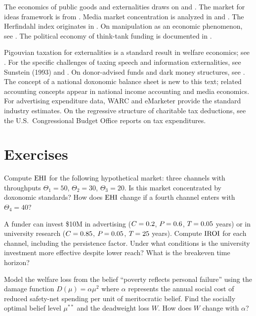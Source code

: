 The economics of public goods and externalities draws on \textcite{stiglitz2012} and \textcite{arrow1963}.
The market for ideas framework is from \textcite{coase1974}.
Media market concentration is analyzed in \textcite{bagdikian2004} and \textcite{mcchesney1999}.
The Herfindahl index originates in \textcite{herfindahl1950}.
On manipulation as an economic phenomenon, see \textcite{akerlof2015}.
The political economy of think-tank funding is documented in \textcite{mayer2016}.

Pigouvian taxation for externalities is a standard result in welfare economics; see \textcite{stiglitz2012}.
For the specific challenges of taxing speech and information externalities, see Sunstein (1993) and \textcite{sunstein2017}.
On donor-advised funds and dark money structures, see \textcite{mayer2016}.
The concept of a national doxonomic balance sheet is new to this text; related accounting concepts appear in national income accounting and media economics.
For advertising expenditure data, WARC and eMarketer provide the standard industry estimates.
On the regressive structure of charitable tax deductions, see the U.S.\ Congressional Budget Office reports on tax expenditures.


\section{Exercises}

\begin{exercise}
Compute $\mathrm{EHI}$ for the following hypothetical market: three channels with throughputs $\Theta_1 = 50$, $\Theta_2 = 30$, $\Theta_3 = 20$.
Is this market concentrated by doxonomic standards?
How does $\mathrm{EHI}$ change if a fourth channel enters with $\Theta_4 = 40$?
\end{exercise}

\begin{exercise}
A funder can invest \$10M in advertising ($C_{} = 0.2$, $P_{} = 0.6$, $T_{} = 0.05$ years) or in university research ($C_{} = 0.85$, $P_{} = 0.05$, $T_{} = 25$ years).
Compute $\mathrm{IROI}$ for each channel, including the persistence factor.
Under what conditions is the university investment more effective despite lower reach?
What is the breakeven time horizon?
\end{exercise}

\begin{exercise}
Model the welfare loss from the belief ``poverty reflects personal failure'' using the damage function $D(\mu) = \alpha \mu^2$ where $\alpha$ represents the annual social cost of reduced safety-net spending per unit of meritocratic belief.
Find the socially optimal belief level $\mu^{**}$ and the deadweight loss $W$.
How does $W$ change with $\alpha$?
\end{exercise}

